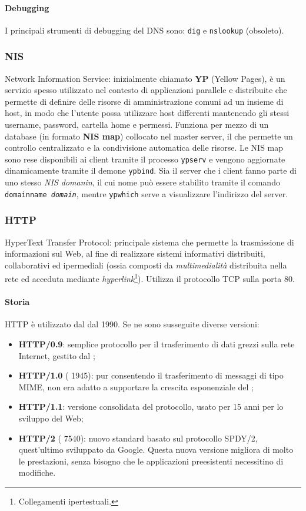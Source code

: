 \documentclass[a4paper, twoside]{article}
\def\code#1{\texttt{#1}}
\def\subsub#1{\subsubsection{#1}\label{#1}}
\def\vedi#1{\nameref{#1}}
\begin{document}
\paragraph{Debugging} I principali strumenti di debugging del DNS sono: \code{dig} e \code{nslookup} (obsoleto).
\newpage
\subsub{NIS}
Network Information Service: inizialmente chiamato \textbf{YP} (Yellow Pages), è un servizio spesso utilizzato nel contesto di applicazioni parallele e distribuite che permette di definire delle risorse di amministrazione comuni ad un insieme di host, in modo che l'utente possa utilizzare host differenti mantenendo gli stessi username, password, cartella home e permessi. Funziona per mezzo di un database (in formato \textbf{NIS map}) collocato nel master server, il che permette un controllo centralizzato e la condivisione automatica delle risorse. Le NIS map sono rese disponibili ai client tramite il processo \code{ypserv} e vengono aggiornate dinamicamente tramite il demone \code{ypbind}. Sia il server che i client fanno parte di uno stesso \textit{NIS domanin}, il cui nome può essere stabilito tramite il comando \code{domainname \textit{domain}}, mentre \code{ypwhich} serve a visualizzare l'indirizzo del server. 
\subsub{HTTP} 
HyperText Transfer Protocol: principale sistema che permette la trasmissione di informazioni sul Web, al fine di realizzare sistemi informativi distribuiti, collaborativi ed ipermediali (ossia composti da \textit{multimedialità} distribuita nella rete ed acceduta mediante \textit{hyperlink}\footnote{Collegamenti ipertestuali.}). Utilizza il protocollo TCP sulla porta 80.
\paragraph{Storia} HTTP è utilizzato dal \vedi{WWW} dal 1990. Se ne sono susseguite diverse versioni:
\begin{itemize}
\item \textbf{HTTP/0.9}: semplice protocollo per il trasferimento di dati grezzi sulla rete Internet, gestito dal \vedi{W3C};
\item \textbf{HTTP/1.0} (\vedi{RFC} 1945): pur consentendo il trasferimento di messaggi di tipo MIME, %
non era adatto a supportare la crescita esponenziale del \vedi{WWW};
\item \textbf{HTTP/1.1}: versione consolidata del protocollo, usato per 15 anni per lo sviluppo del Web;
\item \textbf{HTTP/2} (\vedi{RFC} 7540): nuovo standard basato sul protocollo SPDY/2, quest'ultimo sviluppato da Google. Questa nuova versione migliora di molto le prestazioni, senza bisogno che le applicazioni preesistenti necessitino di modifiche. 
\end{itemize}
\end{document}
